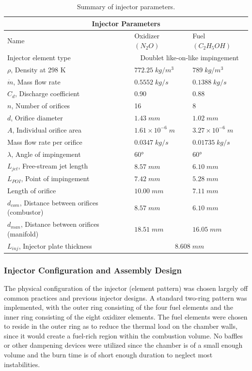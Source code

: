 \documentclass[9pt]{article} %
\numberwithin{equation}{section} %
\begin{document}
\begin{table}[!htb]
\centering
\begin{tabular}{ |p{6.75cm}||p{2.75cm}|p{2.75cm}| }
\hline
\multicolumn{3}{|c|}{Injector Parameters} \\
\hline
Name & Oxidizer $(N_{2}O)$ & Fuel $(C_{2}H_{5}OH)$ \\ 
\hline
Injector element type & \multicolumn{2}{|c|}{Doublet like-on-like impingement}  \\
\hline
$\rho$, Density at 298 K  &  $772.25 \; kg/m^{3}$ &  $789 \; kg/m^{3}$  \\
$\dot{m}$, Mass flow rate & $0.5552 \; kg/s$ &  $0.1388 \; kg/s$ \\
$C_{d}$, Discharge coefficient & 0.90 & 0.88 \\
$n$, Number of orifices & 16 & 8 \\
$d$, Orifice diameter & $1.43 \; mm$ & $1.02 \; mm$ \\
$A$, Individual orifice area & $1.61 \times 10^{-6} \; m$ & $3.27 \times 10^{-6} \; m$ \\
Mass flow rate per orifice & $0.0347 \; kg/s$ & $0.01735 \; kg/s$ \\
$\lambda$, Angle of impingement & $\ang{60}$ & $\ang{60}$ \\
$L_{jet}$, Free-stream jet length & $8.57 \; mm$ & $6.10 \; mm$ \\
$L_{POI}$, Point of impingement & $7.42 \; mm$ & $5.28 \; mm$ \\
Length of orifice & $10.00 \; mm$ & $7.11 \; mm$ \\
$d_{com}$, Distance between orifices (combustor) & $8.57 \; mm$ & $6.10 \; mm$ \\
$d_{man}$, Distance between orifices (manifold) & $18.51 \; mm$ & $16.05 \; mm$ \\
\hline
$L_{inj}$, Injector plate thickness & \multicolumn{2}{|c|}{$8.608 \; mm$}  \\
\hline
\end{tabular}
\caption{Summary of injector parameters.}
\label{table:injector_parameters}
\end{table}

\subsubsection{Injector Configuration and Assembly Design}

\hspace{\parindent} The physical configuration of the injector (element pattern) was chosen largely off common practices and previous injector designs. A standard two-ring pattern was implemented, with the outer ring consisting of the four fuel elements and the inner ring consisting of the eight oxidizer elements. The fuel elements were chosen to reside in the outer ring as to reduce the thermal load on the chamber walls, since it would create a fuel-rich region within the combustion volume. No baffles or other dampening devices were utilized since the chamber is of a small enough volume and the burn time is of short enough duration to neglect most instabilities. 
\end{document}
